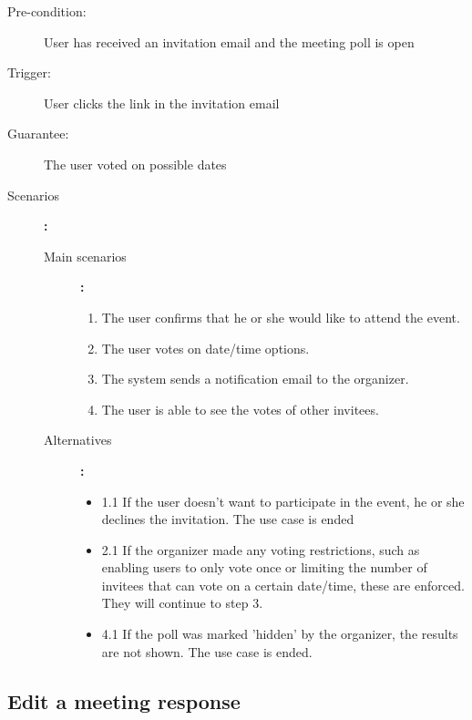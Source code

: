 \begin{description}
	\item[Pre-condition:] User has received an invitation email and the meeting poll is open
	\item[Trigger:] User clicks the link in the invitation email
	\item[Guarantee:] The user voted on possible dates
	\item[Scenarios]\textbf{:}\\
				\begin{description}
					\item[Main scenarios]\textbf{:}\\
								\begin{enumerate}
									\item The user confirms that he or she would like to attend the event.
									\item The user votes on date/time options.
									\item The system sends a notification email to the organizer.
									\item The user is able to see the votes of other invitees.
								\end{enumerate}
					\item[Alternatives]\textbf{:}\\
								\begin{itemize}
									\item 1.1 If the user doesn't want to participate in the event, he or she declines the invitation.	The use case is ended
									\item 2.1 If the organizer made any voting restrictions, such as enabling users to only vote once or limiting the number of invitees that can vote on a certain date/time, these are enforced. They will continue to step 3.
									\item 4.1 If the poll was marked 'hidden' by the organizer, the results are not shown. The use case is ended.
								\end{itemize}
				\end{description}
\end{description}

\subsection{Edit a meeting response}

